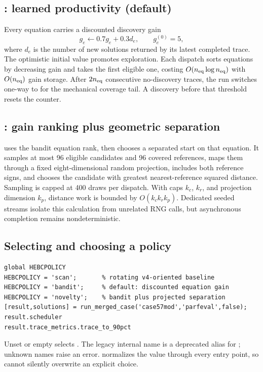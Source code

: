 \subsection{: learned productivity (default)}
Every equation carries a discounted discovery gain
\[
g_e\leftarrow0.7g_e+0.3d_e,\qquad g_e^{(0)}=5,
\]
where $d_e$ is the number of new solutions returned by its latest completed
trace. The optimistic initial value promotes exploration. Each dispatch sorts
equations by decreasing gain and takes the first eligible one, costing
$O(n_{\rm eq}\log n_{\rm eq})$ with $O(n_{\rm eq})$ gain storage.
After $2n_{\rm eq}$ consecutive no-discovery traces, the run switches one-way
to  for the mechanical coverage tail. A discovery before that
threshold resets the counter.

\subsection{: gain ranking plus geometric separation}
 uses the bandit equation rank, then chooses a separated start on
that equation. It samples at most 96 eligible candidates and 96 covered
references, maps them through a fixed eight-dimensional random projection,
includes both reference signs, and chooses the candidate with greatest
nearest-reference squared distance. Sampling is capped at 400 draws per
dispatch. With caps $k_c$, $k_r$, and projection dimension $k_p$, distance work
is bounded by $O(k_c k_r k_p)$. Dedicated seeded streams isolate this calculation
from unrelated RNG calls, but asynchronous completion remains nondeterministic.

\subsection{Selecting and choosing a policy}
\begin{lstlisting}[style=mat]
global HEBCPOLICY
HEBCPOLICY = 'scan';       % rotating v4-oriented baseline
HEBCPOLICY = 'bandit';     % default: discounted equation gain
HEBCPOLICY = 'novelty';    % bandit plus projected separation
[result,solutions] = run_merged_case('case57mod','parfeval',false);
result.scheduler
result.trace_metrics.trace_to_90pct
\end{lstlisting}
Unset or empty selects . The legacy internal name  is
a deprecated alias for ; unknown names raise an error.
 normalizes the value through every entry point, so
 cannot silently overwrite an explicit choice.

